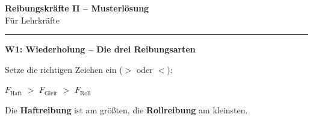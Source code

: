 \documentclass[11pt,a4paper]{article}
\newcommand{\lsg}[1]{\textcolor{loesung}{\textbf{#1}}}
\begin{document}
\begin{minipage}[t]{0.80\textwidth}
    \vspace{0pt}
    {\Large\bfseries Reibungskräfte II -- \textcolor{loesung}{Musterlösung}}\\[0.2em]
    {\small Für Lehrkräfte}
\end{minipage}
\vspace{0.1em}
\hrule
\vspace{0.4em}

\begin{merkkasten}
\textbf{W1: Wiederholung -- Die drei Reibungsarten}

\vspace{0.3em}
Setze die richtigen Zeichen ein ($>$ oder $<$):

\vspace{0.2em}
\begin{center}
{\large $F_{\text{Haft}}$ \lsg{$>$} $F_{\text{Gleit}}$ \lsg{$>$} $F_{\text{Roll}}$}
\end{center}

\vspace{0.2em}
Die \lsg{Haftreibung} ist am größten, die \lsg{Rollreibung} am kleinsten.
\end{merkkasten}

\vspace{0.3em}
\end{document}
